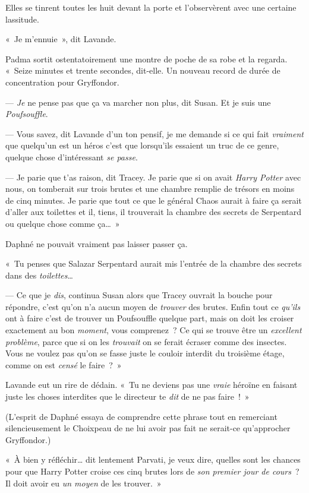 Elles se tinrent toutes les huit devant la porte et l'observèrent avec une certaine lassitude.

«~Je m'ennuie~», dit Lavande.

Padma sortit ostentatoirement une montre de poche de sa robe et la regarda.
«~Seize minutes et trente secondes, dit-elle.
Un nouveau record de durée de concentration pour Gryffondor.

--- \emph{Je} ne pense pas que ça va marcher non plus, dit Susan.
Et je suis une \emph{Poufsouffle}.

--- Vous savez, dit Lavande d'un ton pensif, je me demande si ce qui fait \emph{vraiment} que quelqu'un est un héros c'est que lorsqu'ils essaient un truc de ce genre, quelque chose d'intéressant \emph{se passe}.

--- Je parie que t'as raison, dit Tracey.
Je parie que si on avait \emph{Harry Potter} avec nous, on tomberait sur trois brutes et une chambre remplie de trésors en moins de cinq minutes.
Je parie que tout ce que le général Chaos aurait à faire ça serait d'aller aux toilettes et il, tiens, il trouverait la chambre des secrets de Serpentard ou quelque chose comme ça…~»

Daphné ne pouvait vraiment pas laisser passer ça.

«~Tu penses que Salazar Serpentard aurait mis l'entrée de la chambre des secrets dans des \emph{toilettes}…

--- Ce que je \emph{dis}, continua Susan alors que Tracey ouvrait la bouche pour répondre, c'est qu'on n'a aucun moyen de \emph{trouver} des brutes.
Enfin tout ce \emph{qu'ils} ont à faire c'est de trouver un Poufsouffle quelque part, mais on doit les croiser exactement au bon \emph{moment}, vous comprenez~?
Ce qui se trouve être un \emph{excellent problème}, parce que si on les \emph{trouvait} on se ferait écraser comme des insectes.
Vous ne voulez pas qu'on se fasse juste le couloir interdit du troisième étage, comme on est \emph{censé} le faire~?~»

Lavande eut un rire de dédain.
«~Tu ne deviens pas une \emph{vraie} héroïne en faisant juste les choses interdites que le directeur te \emph{dit} de ne pas faire~!~»

(L'esprit de Daphné essaya de comprendre cette phrase tout en remerciant silencieusement le Choixpeau de ne lui avoir pas fait ne serait-ce qu'approcher Gryffondor.)

«~À bien y réfléchir… dit lentement Parvati, je veux dire, quelles sont les chances pour que Harry Potter croise ces cinq brutes lors de \emph{son premier jour de cours}~?
Il doit avoir eu \emph{un moyen} de les trouver.~»

